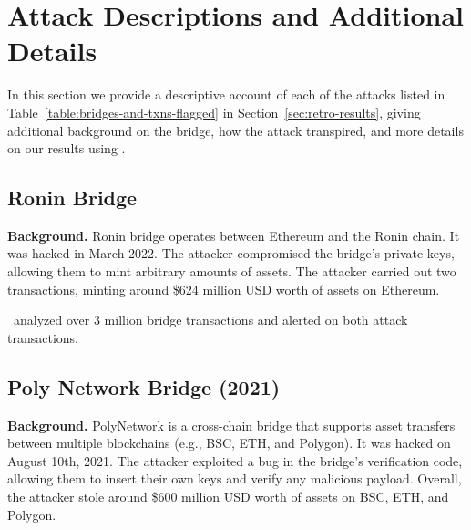 \appendix

\newcommand{\bridgehash}[1]{\texttt{\zz#1\zz}}%
\def\zz#1{%
 \ifx\zz#1\else
   #1\linebreak[1]\expandafter\zz
 \fi}



\section{Attack Descriptions and Additional Details}
\label{sec:attack-summaries}

In this section we provide a descriptive account of each of the
attacks listed in Table~\ref{table:bridges-and-txns-flagged} in
Section~\ref{sec:retro-results}, giving additional background on the
bridge, how the attack transpired, and more details on our results
using \offlinetool.

\subsection{Ronin Bridge}
\textbf{Background.} Ronin bridge operates between Ethereum and the Ronin chain. It was hacked in March 2022. The attacker compromised the bridge's private keys, allowing them to mint arbitrary amounts of assets. The attacker carried out two transactions, minting around \$624 million USD worth of assets on Ethereum.

 \offlinetool~analyzed over 3 million bridge transactions and alerted on both attack transactions.

\subsection{Poly Network Bridge (2021)}
\textbf{Background.} PolyNetwork is a cross-chain bridge that supports asset transfers between multiple blockchains (e.g., BSC, ETH, and Polygon). It was hacked on August 10th, 2021. The attacker exploited a bug in the bridge's verification code, allowing them to insert their own keys and verify any malicious payload. Overall, the attacker stole around \$600 million USD worth of assets on BSC, ETH, and Polygon.

